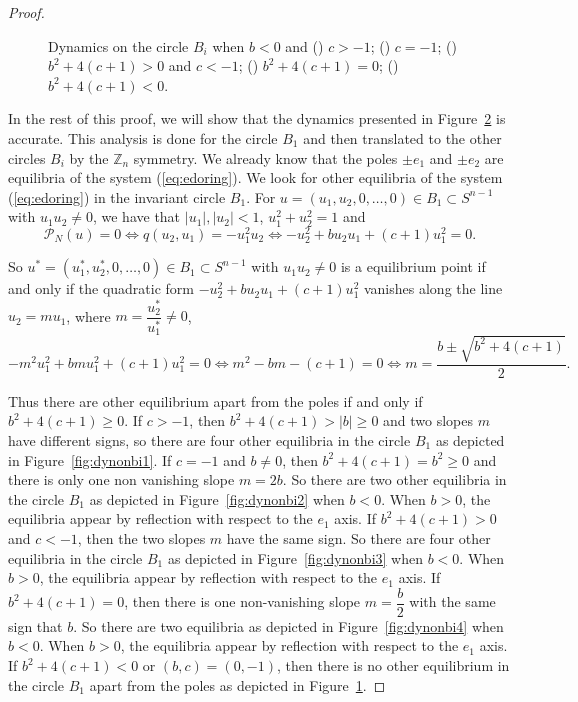 \documentclass{article}
\theoremstyle{definition}
\begin{document}
\begin{proof}
\begin{figure}[ht]
\begin{subfigure}{0.15\textwidth}
\begin{center}
 \end{center}
\caption{ }\label{fig:dynonbi5}
\end{subfigure}
\caption{Dynamics on the circle $B_i$ when $b<0$ and () $c>-1$; () $c=-1$; () $b^2+4(c+1)>0$ and $c<-1$; () $b^2+4(c+1)=0$; () $b^2 + 4(c + 1) < 0$.}
\label{fig:dynonbi}
\end{figure}


In the rest of this proof, we will show that the dynamics presented in Figure~\ref{fig:dynonbi} is accurate. This analysis is  done for the circle $B_1$ and then translated to the other circles $B_i$ by the $\mathbb{Z}_n$ symmetry. 
We already know that the poles $\pm e_1$ and $\pm e_2$ are equilibria of the system (\ref{eq:edoring}).
We look for other equilibria of the system (\ref{eq:edoring}) in the invariant circle $B_1$. For $u=(u_1,u_2,0,\dots,0)\in B_1\subset S^{n-1}$ with $u_1u_2\neq 0$, we have that $|u_1|,|u_2|<1$, $u_1^2+u_2^2=1$ and
$$\mathcal{P}_N(u)=0
\Leftrightarrow 
q(u_2,u_1) = - u_1^2u_2 
\Leftrightarrow 
- u_2^2+b u_2u_1+(c+1) u_1^2= 0.
$$

So $u^*=(u_1^*,u_2^*,0,\dots,0)\in B_1\subset S^{n-1}$ with $u_1u_2\neq 0$ is a equilibrium point if and only if  the quadratic form $-u_2^2+b u_2u_1+(c+1) u_1^2$ vanishes along the line $u_2=m u_1$, where $m=\dfrac{u_2^*}{u_1^*}\neq 0$,
 $$- m^2 u_1^2+b m u_1^2+(c+1) u_1^2= 0\Leftrightarrow  m^2 - b m-(c+1) = 0\Leftrightarrow m=\dfrac{b\pm\sqrt{b^2+4(c+1)}}{2}.$$

Thus there are other equilibrium apart from the poles if and only if $b^2+4(c+1)\geq 0$.
If $c>-1$, then $b^2+4(c+1)>|b|\geq 0$ and two slopes $m$ have different signs, so there are four other equilibria in the circle $B_1$ as depicted in Figure~\ref{fig:dynonbi1}.
If $c=-1$ and $b\neq 0$, then $b^2+4(c+1)=b^2\geq 0$ and there is only one non vanishing slope $m=2b$. So there are two other equilibria in the circle $B_1$ as depicted in Figure~\ref{fig:dynonbi2} when $b<0$. When $b>0$, the equilibria appear by reflection with respect to the $e_1$ axis.
If $b^2+4(c+1)>0$ and $c<-1$, then the two slopes $m$ have the same sign. So there are four other equilibria in the circle $B_1$ as depicted in Figure~\ref{fig:dynonbi3} when $b<0$. When $b>0$, the equilibria appear by reflection with respect to the $e_1$ axis.
If $b^2+4(c+1)=0$, then there is one non-vanishing slope $m=\dfrac{b}{2}$ with the same sign that $b$. So there are two equilibria as depicted in Figure~\ref{fig:dynonbi4} when $b<0$. When $b>0$, the equilibria appear by reflection with respect to the $e_1$ axis.
If $b^2+4(c+1)<0$ or $(b,c)=(0,-1)$, then there is no other equilibrium in the circle $B_1$ apart from the poles as depicted in Figure~\ref{fig:dynonbi5}.


\end{proof}
\end{document}

